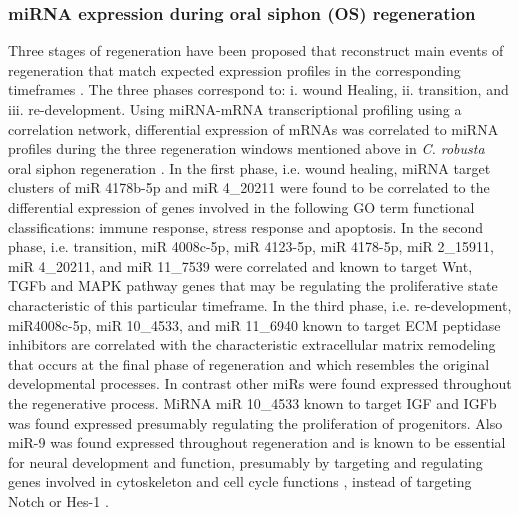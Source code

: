 \documentclass[graybox]{svmult}
\begin{document}
\subsubsection{miRNA expression during oral siphon (OS) regeneration}
Three stages of regeneration have been proposed that reconstruct main events of 
regeneration that match expected expression profiles in the corresponding 
timeframes \cite{Knapp:2013}. The three phases correspond to: i. wound Healing, 
ii. transition, and iii. re-development. Using miRNA-mRNA transcriptional 
profiling using a correlation network, differential expression of mRNAs was 
correlated to miRNA profiles during the three regeneration windows mentioned 
above in \textit{C. robusta} oral siphon regeneration \cite{Spina:2017}. In 
the first phase, i.e. wound healing, miRNA target clusters of miR 4178b-5p and 
miR 4\_20211 were found to be correlated to the differential expression of 
genes involved in the following GO term functional classifications: immune 
response, stress response and apoptosis. In the second phase, i.e. transition, 
miR 4008c-5p, miR 4123-5p, miR 4178-5p, miR 2\_15911, miR 4\_20211, and miR 
11\_7539 were correlated and known to target Wnt, TGFb and MAPK pathway genes 
that may be regulating the proliferative state characteristic of this particular 
timeframe. In the third phase, i.e. re-development, miR4008c-5p, miR 10\_4533, 
and miR 11\_6940 known to target ECM peptidase inhibitors are correlated with 
the characteristic extracellular matrix remodeling that occurs at the final 
phase of regeneration and which resembles the original developmental processes. 
In contrast other miRs were found expressed throughout the regenerative 
process. MiRNA miR 10\_4533 known to target IGF and IGFb was found expressed 
presumably regulating the proliferation of progenitors. Also miR-9 was found 
expressed throughout regeneration and is known to be essential for neural 
development and function, presumably by targeting and regulating genes involved 
in cytoskeleton and cell cycle functions \cite{Galderisi:2003rt, 
MCBEATH2004483}, instead of targeting Notch or Hes-1 \cite{Spina:2017}.
\end{document}
